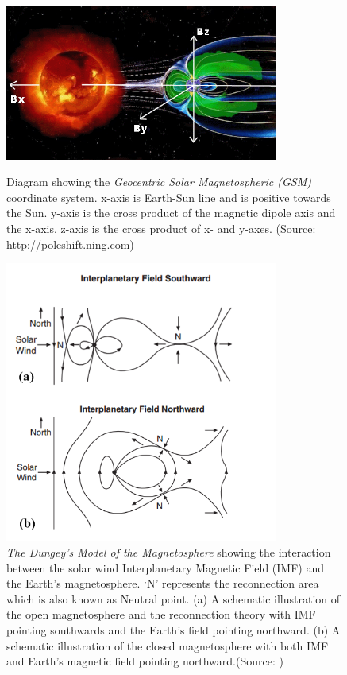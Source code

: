 \documentclass[12pt]{report} %
\begin{document}
\begin{figure} 
\centering
 \vspace{-20pt}
    \includegraphics[width=0.8\textwidth]{./gsm}
 \vspace{5pt}
  \caption{Diagram showing the \emph{Geocentric Solar Magnetospheric (GSM)} coordinate system. x-axis is Earth-Sun line and is positive towards the Sun. y-axis is the cross product of the magnetic dipole axis and the x-axis. z-axis is the cross product of x- and y-axes. (Source: http://poleshift.ning.com)} \label{fig:gsm}
   \vspace{5pt}
   
   \includegraphics[width=0.8\textwidth]{./imf}
 \vspace{0pt}
  \caption{\emph{The Dungey's Model of the Magnetosphere} showing the interaction between the solar wind Interplanetary Magnetic Field (IMF) and the Earth’s magnetosphere. `N' represents the reconnection area which is also known as Neutral point. (a) A schematic illustration of the open magnetosphere and the reconnection theory with IMF pointing southwards and the Earth’s field pointing northward. (b) A schematic illustration of the closed magnetosphere with both IMF and Earth’s magnetic field pointing northward.(Source: \cite{russell00})} \label{fig:imf}
\end{figure} 
\vspace{-10pt}
\end{document}
